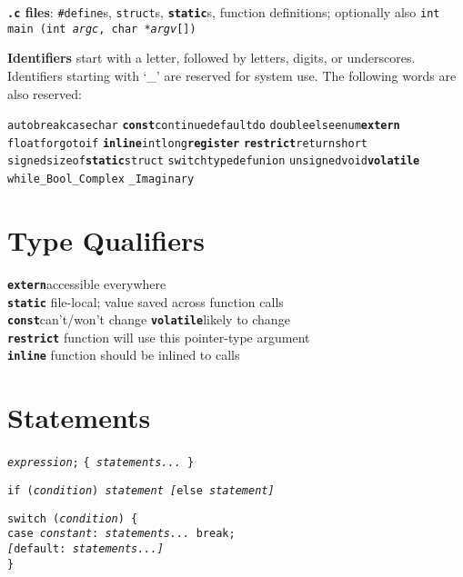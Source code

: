 \documentclass[8pt]{article}
\newcommand{\Cc}[1]{\texttt{#1}}
\newcommand{\cpp}[1]{\textcolor{black!20!cyan}{\texttt{\##1}}} %
\newcommand{\kw}[1]{\textcolor{black!40!lime}{\texttt{#1}}} %
\newcommand{\ty}[1]{\textcolor{blue!80}{\texttt{#1}}} %
\newcommand{\mty}[1]{\textcolor{blue!80}{\texttt{\textbf{#1}}}} %
\newcommand{\fn}[1]{\texttt{#1}} %
\newcommand{\var}[1]{\texttt{\textit{#1}}} %
\newcommand{\opt}[1]{\textrm{\textit{#1}}} %
\begin{document}
\begin{multicols}{3}
\textbf{\texttt{.c} files}:
\cpp{define}s, \kw{struct}s, \mty{static}s, function definitions;
optionally also\hfill
\Cc{\ty{int} \fn{main} (\ty{int} \var{argc}, \ty{char *}\var{argv}[])}

\textbf{Identifiers} start with a letter,
followed by letters, digits, or underscores.
Identifiers starting with `\_' are reserved for system use.
The following words are also reserved:

\begin{center}
  \kw{auto}\quad \kw{break}\quad \kw{case}\quad \ty{char}\quad
  \mty{const}\quad \kw{continue}\quad \kw{default}\quad \kw{do}\quad
  \ty{double}\quad \kw{else}\quad \ty{enum}\quad \mty{extern}\quad
  \ty{float}\quad \kw{for}\quad \kw{goto}\quad \kw{if}\quad
  \mty{inline}\quad \kw{int}\quad \kw{long}\quad \mty{register}\quad
  \mty{restrict}\quad \kw{return}\quad \ty{short}\quad
  \ty{signed}\quad \fn{sizeof}\quad \mty{static}\quad \ty{struct}\quad
  \kw{switch}\quad \kw{typedef}\quad \ty{union}\quad
  \ty{unsigned}\quad \ty{void}\quad \mty{volatile}\quad
  \kw{while}\quad \ty{\_Bool}\quad \ty{\_Complex}\quad
  \ty{\_Imaginary}\quad
\end{center}

\section*{Type Qualifiers}

\mty{extern}\quad accessible everywhere \\
\mty{static}\quad
    file-local; value saved across function calls \\
\mty{const}\quad can't/won't change \hfill
\mty{volatile}\quad likely to change \\
\mty{restrict}\quad
    function will use this pointer-type argument \\
\mty{inline}\quad
    function should be inlined to calls \\


\section*{Statements}

\Cc{\opt{expression};} \hfill
\Cc{\{ \opt{statements...} \}}

\Cc{\kw{if} (\opt{condition}) \opt{statement} \opt{[}\kw{else} \opt{statement}\opt{]}}

\Cc{\kw{switch} (\opt{condition}) \{ \\
\kw{case} \opt{constant}: \opt{statements...} \kw{break}; \\
\opt{[}\kw{default}: \opt{statements...}\opt{]} \\
\}}


\end{multicols}
\end{document}
